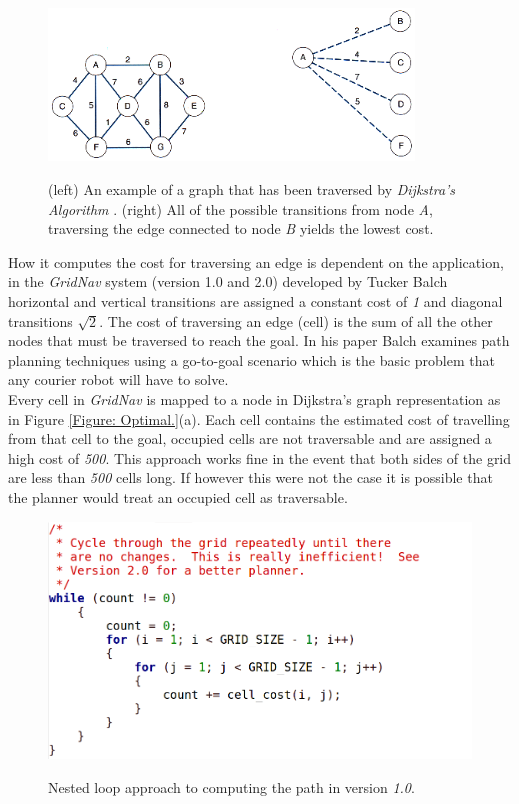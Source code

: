 \begin{figure}[htbp]

\center \includegraphics[width=275pt]{illustrations/graph}\\
\caption{(left) An example of a graph that has been traversed by \textit{Dijkstra's Algorithm} \cite{DIJKSTRA}. (right) All of the possible transitions from node \textit{A}, traversing the edge connected to node \textit{B} yields the lowest cost. \cite{ARNIE13}} 
\label{Figure: Graph.}

\end{figure}

\noindent
How it computes the cost for traversing an edge is dependent on the application, in the \textit{GridNav} \cite{GRIDNAV95} system (version 1.0 and 2.0) developed by Tucker Balch horizontal and vertical transitions are assigned a constant cost of \textit{1} and diagonal transitions $\sqrt{2}$. The cost of traversing an edge (cell) is the sum of all the other nodes that must be traversed to reach the goal. In his paper Balch examines path planning techniques using a go-to-goal scenario which is the basic problem that any courier robot will have to solve.\\

\noindent
Every cell in \textit{GridNav} is mapped to a node in Dijkstra's graph representation as in Figure \ref{Figure: Optimal.}(a). Each cell contains the estimated cost of travelling from that cell to the goal, occupied cells are not traversable and are assigned a high cost of \textit{500}. This approach works fine in the event that both sides of the grid are less than \textit{500} cells long. If however this were not the case it is possible that the planner would treat an occupied cell as traversable.

\begin{figure}[htbp]

\center \includegraphics[width=325pt]{illustrations/version1}\\
\caption{Nested loop approach to computing the path in version \textit{1.0}. \cite{GRIDNAV95}}
\label{Figure: GridNav Version 1.0.}

\end{figure}

